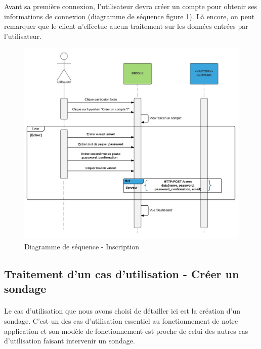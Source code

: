 \documentclass[titlepage]{report}
\begin{document}
\par Avant sa première connexion, l'utilisateur devra créer un compte pour obtenir ses informations de connexion (diagramme de séquence figure \ref{diagramme_sequence_inscription}). Là encore, on peut remarquer que le client n'effectue aucun traitement sur les données entrées par l'utilisateur.

\begin{figure}[h]
	\caption{Diagramme de séquence - Inscription}
	\label{diagramme_sequence_inscription}
	\centering
	\includegraphics[width=\textwidth]{figures/diagrammes/sequence_inscription.png}
\end{figure}

\clearpage

\subsection{Traitement d'un cas d'utilisation - Créer un sondage}

\paragraph{} Le cas d'utilisation que nous avons choisi de détailler ici est la création d'un sondage. C'est un des cas d'utilisation essentiel au fonctionnement de notre application et son modèle de fonctionnement est proche de celui des autres cas d'utilisation faisant intervenir un sondage.
\end{document}
